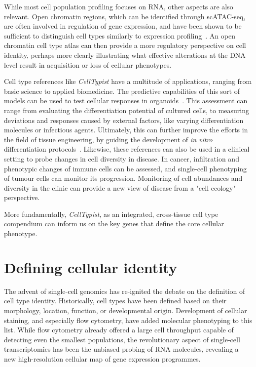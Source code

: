 While most cell population profiling focuses on RNA, other aspects are also relevant. Open chromatin regions, which can be identified through scATAC-seq, are often involved in regulation of gene expression, and have been shown to be sufficient to distinguish cell types similarly to expression profiling~\citep{cusanovich_single-cell_2018}. An open chromatin cell type atlas can then provide a more regulatory perspective on cell identity, perhaps more clearly illustrating what effective alterations at the DNA level result in acquisition or loss of cellular phenotypes.

Cell type references like \textit{CellTypist} have a multitude of applications, ranging from basic science to applied biomedicine. The predictive capabilities of this sort of models can be used to test cellular responses in organoids~\citep{brazovskaja_high-throughput_2019}. This assessment can range from evaluating the differentiation potential of cultured cells, to measuring deviations and responses caused by external factors, like varying differentiation molecules or infectious agents. Ultimately, this can further improve the efforts in the field of tissue engineering, by guiding the development of \textit{in vitro} differentiation protocols~\citep{camp_single-cell_2018}. Likewise, these references can also be used in a clinical setting to probe changes in cell diversity in disease. In cancer, infiltration and phenotypic changes of immune cells can be assessed, and single-cell phenotyping of tumour cells can monitor its progression. Monitoring of cell abundances and diversity in the clinic can provide a new view of disease from a "cell ecology" perspective.

More fundamentally, \textit{CellTypist}, as an integrated, cross-tissue cell type compendium can inform us on the key genes that define the core cellular phenotype.


\section{Defining cellular identity}
\label{section_ident}
The advent of single-cell genomics has re-ignited the debate on the definition of cell type identity. Historically, cell types have been defined based on their morphology, location, function, or developmental origin. Development of cellular staining, and especially flow cytometry, have added molecular phenotyping to this list. While flow cytometry already offered a large cell throughput capable of detecting even the smallest populations, the revolutionary aspect of single-cell transcriptomics has been the unbiased probing of RNA molecules, revealing a new high-resolution cellular map of gene expression programmes.

